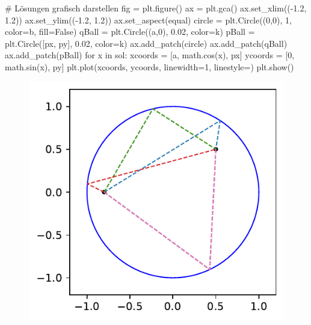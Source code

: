 \documentclass[
  a4paper,
  DIV=11]{scrreprt}
\newenvironment{Shaded}{\begin{snugshade}}{\end{snugshade}}
\newcommand{\CommentTok}[1]{\textcolor[rgb]{0.37,0.37,0.37}{#1}}
\newcommand{\ControlFlowTok}[1]{\textcolor[rgb]{0.00,0.23,0.31}{#1}}
\newcommand{\DecValTok}[1]{\textcolor[rgb]{0.68,0.00,0.00}{#1}}
\newcommand{\FloatTok}[1]{\textcolor[rgb]{0.68,0.00,0.00}{#1}}
\newcommand{\KeywordTok}[1]{\textcolor[rgb]{0.00,0.23,0.31}{#1}}
\newcommand{\NormalTok}[1]{\textcolor[rgb]{0.00,0.23,0.31}{#1}}
\newcommand{\OperatorTok}[1]{\textcolor[rgb]{0.37,0.37,0.37}{#1}}
\newcommand{\StringTok}[1]{\textcolor[rgb]{0.13,0.47,0.30}{#1}}
\newcommand{\VariableTok}[1]{\textcolor[rgb]{0.07,0.07,0.07}{#1}}
\theoremstyle{definition}
\theoremstyle{definition}
\theoremstyle{remark}
\begin{document}
\begin{tcolorbox}
\begin{Shaded}
\begin{Highlighting}[]
    \CommentTok{\# Lösungen grafisch darstellen}
\NormalTok{    fig }\OperatorTok{=}\NormalTok{ plt.figure()}
\NormalTok{    ax }\OperatorTok{=}\NormalTok{ plt.gca()}
\NormalTok{    ax.set\_xlim((}\OperatorTok{{-}}\FloatTok{1.2}\NormalTok{, }\FloatTok{1.2}\NormalTok{))}
\NormalTok{    ax.set\_ylim((}\OperatorTok{{-}}\FloatTok{1.2}\NormalTok{, }\FloatTok{1.2}\NormalTok{))}
\NormalTok{    ax.set\_aspect(}\StringTok{\textquotesingle{}equal\textquotesingle{}}\NormalTok{)}
\NormalTok{    circle }\OperatorTok{=}\NormalTok{ plt.Circle((}\DecValTok{0}\NormalTok{,}\DecValTok{0}\NormalTok{), }\DecValTok{1}\NormalTok{, color}\OperatorTok{=}\StringTok{\textquotesingle{}b\textquotesingle{}}\NormalTok{, fill}\OperatorTok{=}\VariableTok{False}\NormalTok{)}
\NormalTok{    qBall }\OperatorTok{=}\NormalTok{ plt.Circle((a,}\DecValTok{0}\NormalTok{), }\FloatTok{0.02}\NormalTok{, color}\OperatorTok{=}\StringTok{\textquotesingle{}k\textquotesingle{}}\NormalTok{)}
\NormalTok{    pBall }\OperatorTok{=}\NormalTok{ plt.Circle([px, py], }\FloatTok{0.02}\NormalTok{, color}\OperatorTok{=}\StringTok{\textquotesingle{}k\textquotesingle{}}\NormalTok{)}
\NormalTok{    ax.add\_patch(circle)}
\NormalTok{    ax.add\_patch(qBall)}
\NormalTok{    ax.add\_patch(pBall)}
    \ControlFlowTok{for}\NormalTok{ x }\KeywordTok{in}\NormalTok{ sol:}
\NormalTok{        xcoords }\OperatorTok{=}\NormalTok{ [a, math.cos(x), px]}
\NormalTok{        ycoords }\OperatorTok{=}\NormalTok{ [}\DecValTok{0}\NormalTok{, math.sin(x), py]}
\NormalTok{        plt.plot(xcoords, ycoords, linewidth}\OperatorTok{=}\DecValTok{1}\NormalTok{, linestyle}\OperatorTok{=}\StringTok{\textquotesingle{}{-}{-}\textquotesingle{}}\NormalTok{)}
\NormalTok{    plt.show()}
\end{Highlighting}
\end{Shaded}

\begin{figure}[H]

{\centering \includegraphics{ADOneDimManually_files/figure-pdf/fig-billardproblemsolution-output-1.pdf}

}
\end{figure}
\end{tcolorbox}
\end{document}
